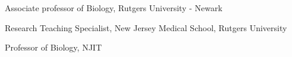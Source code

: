 
        {Associate professor of Biology, Rutgers University - Newark}

       {Research Teaching Specialist, New Jersey Medical School, Rutgers University}

       {Professor of Biology, NJIT}
